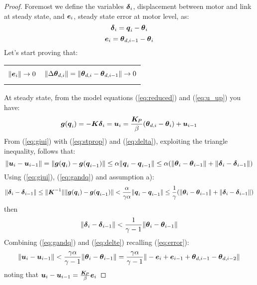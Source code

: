 \begin{proof}
Foremost we define the variables $\boldsymbol{\delta}_i$, displacement between motor and link at steady state, and  $\boldsymbol{e}_i$, steady state error at motor level, as:
\begin{equation} \label{eq:delta}
\boldsymbol{\delta}_i = {\boldsymbol{q}}_i - \boldsymbol{\theta}_i 
\end{equation}
\begin{equation} \label{eq:error}
\boldsymbol{e}_i = \boldsymbol{\theta}_{d,i-1}-\boldsymbol{\theta}_i
\end{equation}
Let's start proving that: \\
{\centering\compress
\begin{tabularx}{\linewidth}{>{\leqnomode}XX}
\begin{equation} \label{eq:etozero}
\|\boldsymbol{e}_i\|\to 0
\end{equation}
& 
\begin{equation} \label{eq:deltatozero}
\|\Delta\boldsymbol{\theta}_{d,i}\| = \|\boldsymbol{\theta}_{d,i}-\boldsymbol{\theta}_{d,i-1}\|\to 0
\end{equation}
\end{tabularx}}
At steady state, from the model equations (\ref{eq:reduced}) and (\ref{eq:u_up}) you have: \\
\begin{equation}\label{eq:giui}
    \boldsymbol{g}({\boldsymbol{q}}_i) = -\boldsymbol{K}\boldsymbol{\delta}_i= \boldsymbol{u}_i = \frac{\boldsymbol{K}_{\!P}}{\beta}(\boldsymbol{\theta}_{d,i}-\boldsymbol{\theta}_i) + \boldsymbol{u}_{i-1}
\end{equation}
From (\ref{eq:giui}) with (\ref{eq:stprop}) and (\ref{eq:delta}), exploiting the triangle inequality, follows that:
\begin{equation}\label{eq:gandq}
\|\boldsymbol{u}_i-\boldsymbol{u}_{i-1}\| = \|\boldsymbol{g}({\boldsymbol{q}}_i)-\boldsymbol{g}({\boldsymbol{q}}_{i-1})\| \leq \alpha \|{\boldsymbol{q}}_i-{\boldsymbol{q}}_{i-1}\|
\leq\alpha(\|\boldsymbol{\theta}_i-\boldsymbol{\theta}_{i-1}\|+\|\boldsymbol{\delta}_i-\boldsymbol{\delta}_{i-1}\|)
\end{equation}
Using (\ref{eq:giui}), (\ref{eq:gandq}) and assumption a):
\[
    \| \boldsymbol{\delta}_i - \boldsymbol{\delta}_{i-1} \| \leq \|\boldsymbol{K}^{-1}\| \|\boldsymbol{g}({\boldsymbol{q}}_i)-\boldsymbol{g}({\boldsymbol{q}}_{i-1})\|< \frac{\alpha}{\gamma \alpha}\| {\boldsymbol{q}}_i - {\boldsymbol{q}}_{i-1} \| \leq\frac{1}{\gamma}(\|\boldsymbol{\theta}_i-\boldsymbol{\theta}_{i-1}\|+\|\boldsymbol{\delta}_i-\boldsymbol{\delta}_{i-1}\|)
\]
then
\begin{equation}\label{eq:delte}
    \| \boldsymbol{\delta}_i - \boldsymbol{\delta}_{i-1} \| < \frac{1}{\gamma-1}\|\boldsymbol{\theta}_i-\boldsymbol{\theta}_{i-1}\|
\end{equation}
Combining (\ref{eq:gandq}) and (\ref{eq:delte}) recalling (\ref{eq:error}):
\[
 \|\boldsymbol{u}_i-\boldsymbol{u}_{i-1}\| < \frac{\gamma\alpha}{\gamma-1}\|\boldsymbol{\theta}_i-\boldsymbol{\theta}_{i-1}\|
 = \frac{\gamma\alpha}{\gamma-1}\|-\boldsymbol{e}_i + \boldsymbol{e}_{i-1} + \boldsymbol{\theta}_{d,i-1}-\boldsymbol{\theta}_{d,i-2}\|
\]
noting that \(\boldsymbol{u}_i-\boldsymbol{u}_{i-1} = \frac{\boldsymbol{K}_{\!P}}{\beta} \boldsymbol{e}_i \)


\end{proof}
